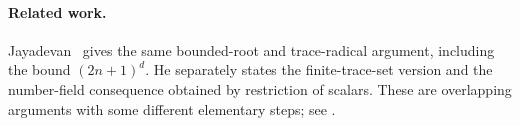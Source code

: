 
\paragraph{Related work.}
Jayadevan~\cite{jayadevan-21-40} gives the same bounded-root and
trace-radical argument, including the bound \((2n+1)^d\).
He separately states the finite-trace-set version and the number-field
consequence obtained by restriction of scalars. These are overlapping
arguments with some different elementary steps; see
\comparisonlocation{}.

